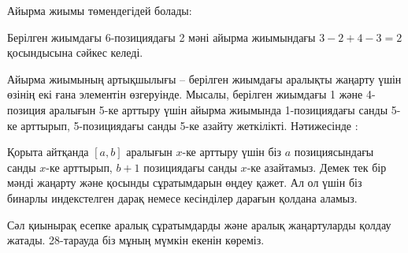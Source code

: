 Айырма жиымы төмендегідей болады:
\begin{center}
\end{center}

Берілген жиымдағы 6-позициядағы 2 мәні 
айырма жиымындағы $3-2+4-3=2$ қосындысына сәйкес келеді. 

Айырма жиымының артықшылығы -- берілген жиымдағы 
аралықты жаңарту үшін өзінің екі ғана
элементін өзгеруінде. Мысалы, берілген жиымдағы 
1 және 4-позиция аралығын 5-ке арттыру үшін 
айырма жиымында 1-позициядағы санды 5-ке арттырып,
5-позициядағы санды 5-ке азайту жеткілікті. 
Нәтижесінде :

\begin{center}
\end{center}

Қорыта айтқанда $[a,b]$ аралығын $x$-ке
арттыру үшін біз $a$ позициясындағы санды $x$-ке
арттырып, $b+1$ позициядағы санды $x$-ке азайтамыз.
Демек тек бір мәнді жаңарту және қосынды сұратымдарын
өңдеу қажет. Ал ол үшін біз бинарлы индекстелген дарақ
немесе кесінділер дарағын қолдана аламыз.

Сәл қиынырақ есепке
аралық сұратымдарды және аралық жаңартуларды қолдау жатады.
28-тарауда біз мұның мүмкін екенін көреміз.


